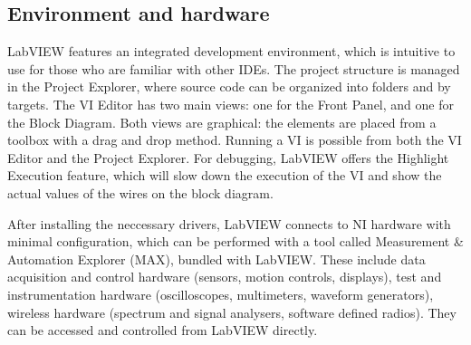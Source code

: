 \subsection{Environment and hardware}
LabVIEW features an integrated development environment, which is intuitive to use for those who are familiar with other IDEs. The project structure is managed in the Project Explorer, where source code can be organized into folders and by targets. The VI Editor has two main views: one for the Front Panel, and one for the Block Diagram. Both views are graphical: the elements are placed from a toolbox with a drag and drop method. Running a VI is possible from both the VI Editor and the Project Explorer. For debugging, LabVIEW offers the Highlight Execution feature, which will slow down the execution of the VI and show the actual values of the wires on the block diagram.

After installing the neccessary drivers, LabVIEW connects to NI hardware with minimal configuration, which can be performed with a tool called Measurement \& Automation Explorer (MAX), bundled with LabVIEW. These include data acquisition and control hardware (sensors, motion controls, displays), test and instrumentation hardware (oscilloscopes, multimeters, waveform generators), wireless hardware (spectrum and signal analysers, software defined radios). They can be accessed and controlled from LabVIEW directly.


